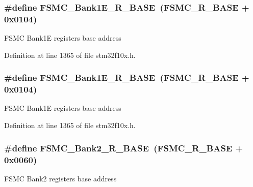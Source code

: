 \subsubsection[{\texorpdfstring{F\+S\+M\+C\+\_\+\+Bank1\+E\+\_\+\+R\+\_\+\+B\+A\+SE}{FSMC_Bank1E_R_BASE}}]{\setlength{\rightskip}{0pt plus 5cm}\#define F\+S\+M\+C\+\_\+\+Bank1\+E\+\_\+\+R\+\_\+\+B\+A\+SE~({\bf F\+S\+M\+C\+\_\+\+R\+\_\+\+B\+A\+SE} + 0x0104)}\hypertarget{group___peripheral__memory__map_gaea182589c84aee30b7f735474d8774e2}{}\label{group___peripheral__memory__map_gaea182589c84aee30b7f735474d8774e2}
F\+S\+MC Bank1E registers base address 

Definition at line 1365 of file stm32f10x.\+h.

\subsubsection[{\texorpdfstring{F\+S\+M\+C\+\_\+\+Bank1\+E\+\_\+\+R\+\_\+\+B\+A\+SE}{FSMC_Bank1E_R_BASE}}]{\setlength{\rightskip}{0pt plus 5cm}\#define F\+S\+M\+C\+\_\+\+Bank1\+E\+\_\+\+R\+\_\+\+B\+A\+SE~({\bf F\+S\+M\+C\+\_\+\+R\+\_\+\+B\+A\+SE} + 0x0104)}\hypertarget{group___peripheral__memory__map_gaea182589c84aee30b7f735474d8774e2}{}\label{group___peripheral__memory__map_gaea182589c84aee30b7f735474d8774e2}
F\+S\+MC Bank1E registers base address 

Definition at line 1365 of file stm32f10x.\+h.

\subsubsection[{\texorpdfstring{F\+S\+M\+C\+\_\+\+Bank2\+\_\+\+R\+\_\+\+B\+A\+SE}{FSMC_Bank2_R_BASE}}]{\setlength{\rightskip}{0pt plus 5cm}\#define F\+S\+M\+C\+\_\+\+Bank2\+\_\+\+R\+\_\+\+B\+A\+SE~({\bf F\+S\+M\+C\+\_\+\+R\+\_\+\+B\+A\+SE} + 0x0060)}\hypertarget{group___peripheral__memory__map_ga3cb46d62f4f6458e186a5a4c753e4918}{}\label{group___peripheral__memory__map_ga3cb46d62f4f6458e186a5a4c753e4918}
F\+S\+MC Bank2 registers base address 

